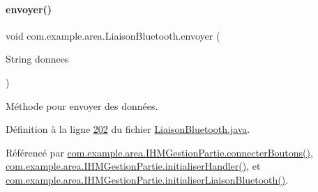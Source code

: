 \paragraph{\texorpdfstring{envoyer()}{envoyer()}}
{\footnotesize\ttfamily void com.\+example.\+area.\+Liaison\+Bluetooth.\+envoyer (\begin{DoxyParamCaption}\item[{String}]{donnees }\end{DoxyParamCaption})}



Méthode pour envoyer des données. 



Définition à la ligne \hyperlink{_liaison_bluetooth_8java_source_l00202}{202} du fichier \hyperlink{_liaison_bluetooth_8java_source}{Liaison\+Bluetooth.\+java}.



Référencé par \hyperlink{_i_h_m_gestion_partie_8java_source_l00346}{com.\+example.\+area.\+I\+H\+M\+Gestion\+Partie.\+connecter\+Boutons()}, \hyperlink{_i_h_m_gestion_partie_8java_source_l00291}{com.\+example.\+area.\+I\+H\+M\+Gestion\+Partie.\+initialiser\+Handler()}, et \hyperlink{_i_h_m_gestion_partie_8java_source_l00329}{com.\+example.\+area.\+I\+H\+M\+Gestion\+Partie.\+initialiser\+Liaison\+Bluetooth()}.


